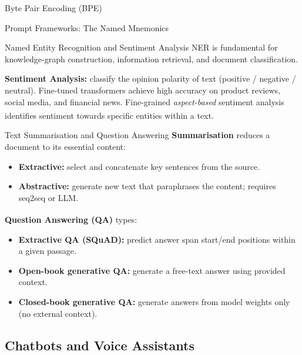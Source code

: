 \begin{v3topic}{Byte Pair Encoding (BPE)}
\begin{v3topic}{Prompt Frameworks: The Named Mnemonics}
\begin{v3topic}{Named Entity Recognition and Sentiment Analysis}
    NER is fundamental for knowledge-graph construction, information retrieval, and
    document classification.

    \textbf{Sentiment Analysis:} classify the opinion polarity of text (positive /
    negative / neutral). Fine-tuned transformers achieve high accuracy on product
    reviews, social media, and financial news. Fine-grained \emph{aspect-based} sentiment
    analysis identifies sentiment towards specific entities within a
    text.\textsuperscript{\cite[][p.~12]{dhamaniIntroductionGenerativeAI2024}}

\end{v3topic}
\begin{v3topic}{Text Summarisation and Question Answering}
    \textbf{Summarisation} reduces a document to its essential content:
    \begin{itemize}
        \item \textbf{Extractive:} select and concatenate key sentences from the source.
        \item \textbf{Abstractive:} generate new text that paraphrases the content;
              requires seq2seq or LLM.
    \end{itemize}

    \textbf{Question Answering (QA)}
    types:\textsuperscript{\cite[][p.~13]{dhamaniIntroductionGenerativeAI2024}}
    \begin{itemize}
        \item \textbf{Extractive QA (SQuAD):} predict answer span start/end positions
              within a given passage.
        \item \textbf{Open-book generative QA:} generate a free-text answer using
              provided context.
        \item \textbf{Closed-book generative QA:} generate answers from model weights
              only (no external context).
    \end{itemize}

\end{v3topic}

\subsection{Chatbots and Voice Assistants}



\end{v3topic}
\end{v3topic}
